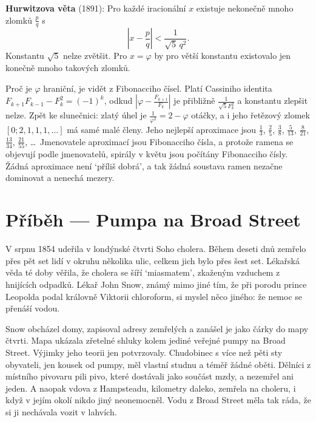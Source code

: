 \begin{definitionbox}
  \textbf{Hurwitzova věta} (1891): Pro každé iracionální $x$ existuje nekonečně mnoho zlomků $\frac{p}{q}$ s
  \begin{equation*}
    \left|x - \frac{p}{q}\right| < \frac{1}{\sqrt{5}\,q^2}.
  \end{equation*}
  Konstantu $\sqrt{5}$ nelze zvětšit. Pro $x = \varphi$ by pro větší konstantu existovalo jen konečně mnoho takových zlomků.
\end{definitionbox}

Proč je $\varphi$ hraniční, je vidět z Fibonacciho čísel. Platí Cassiniho identita $F_{k+1}F_{k-1} - F_k^2 = (-1)^k$, odkud $\left|\varphi - \frac{F_{k+1}}{F_k}\right|$ je přibližně $\frac{1}{\sqrt{5}F_k^2}$ a konstantu zlepšit nelze. Zpět ke slunečnici: zlatý úhel je $\frac{1}{\varphi^2} = 2 - \varphi$ otáčky, a i jeho řetězový zlomek $[0; 2, 1, 1, 1, \dots]$ má samé malé členy. Jeho nejlepší aproximace jsou $\frac{1}{3}$, $\frac{2}{5}$, $\frac{3}{8}$, $\frac{5}{13}$, $\frac{8}{21}$, $\frac{13}{34}$, $\frac{21}{55}$, \dots\ Jmenovatele aproximací jsou Fibonacciho čísla, a protože ramena se objevují podle jmenovatelů, spirály v květu jsou počítány Fibonacciho čísly. Žádná aproximace není `příliš dobrá', a tak žádná soustava ramen nezačne dominovat a nenechá mezery.

\section{Příběh --- Pumpa na Broad Street}

V srpnu 1854 udeřila v londýnské čtvrti Soho cholera. Během deseti dnů zemřelo přes pět set lidí v okruhu několika ulic, celkem jich bylo přes šest set. Lékařská věda té doby věřila, že cholera se šíří `miasmatem', zkaženým vzduchem z hnijících odpadků. Lékař John Snow, známý mimo jiné tím, že při porodu prince Leopolda podal královně Viktorii chloroform, si myslel něco jiného: že nemoc se přenáší vodou.

Snow obcházel domy, zapisoval adresy zemřelých a zanášel je jako čárky do mapy čtvrti. Mapa ukázala zřetelné shluky kolem jediné veřejné pumpy na Broad Street. Výjimky jeho teorii jen potvrzovaly. Chudobinec s více než pěti sty obyvateli, jen kousek od pumpy, měl vlastní studnu a téměř žádné oběti. Dělníci z místního pivovaru pili pivo, které dostávali jako součást mzdy, a nezemřel ani jeden. A naopak vdova z Hampsteadu, kilometry daleko, zemřela na choleru, i když v jejím okolí nikdo jiný neonemocněl. Vodu z Broad Street měla tak ráda, že si ji nechávala vozit v lahvích.

